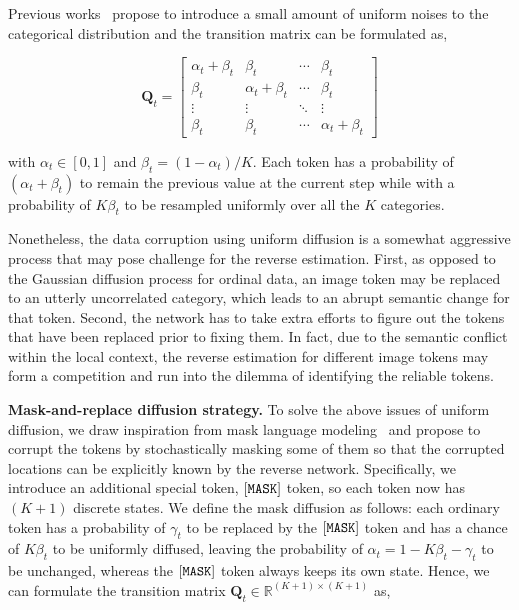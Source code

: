 Previous works~\cite{hoogeboom2021argmax,austin2021structured} propose to introduce a small amount of uniform noises to the categorical distribution and the transition matrix can be formulated as,

\begin{equation}
\bm{Q}_t =
\begin{bmatrix}
\alpha_t + \beta_t &  \beta_t & \cdots &\beta_t\\
\beta_t & \alpha_t +  \beta_t & \cdots&\beta_t\\
\vdots & \vdots &  \ddots   & \vdots\\
\beta_t & \beta_t &  \cdots &\alpha_t+\beta_t
\end{bmatrix}
\end{equation}

with $\alpha_t\in[0,1]$ and $\beta_t = (1-\alpha_t)/K$. Each token has a probability of $(\alpha_t+\beta_t)$ to remain the previous value at the current step while with a probability of $K\beta_t$ to be resampled uniformly over all the $K$ categories. 

Nonetheless, the data corruption using uniform diffusion is a somewhat aggressive process that may pose challenge for the reverse estimation. First, as opposed to the Gaussian diffusion process for ordinal data, an image token may be replaced to an utterly uncorrelated category, which leads to an abrupt semantic change for that token. Second, the network has to take extra efforts to figure out the tokens that have been replaced prior to fixing them. In fact, due to the semantic conflict within the local context, the reverse estimation for different image tokens may form a competition and run into the dilemma of identifying the reliable tokens. 

\textbf{Mask-and-replace diffusion strategy.} To solve the above issues of uniform diffusion, we draw inspiration from mask language modeling~\cite{devlin2018bert} and propose to corrupt the tokens by stochastically masking some of them so that the corrupted locations can be explicitly known by the reverse network. Specifically, we introduce an additional special token, $[\text{\tt{MASK}}]$ token, so each token now has $(K+1)$ discrete states. We define the mask diffusion as follows: each ordinary token has a probability of $\gamma_t$ to be replaced by the $[\text{\tt{MASK}}]$ token and has a chance of $K\beta_t$ to be uniformly diffused, leaving the probability of $\alpha_t = 1-K\beta_t-\gamma_t$ to be unchanged, whereas the $[\text{\tt{MASK}}]$ token always keeps its own state. Hence, we can formulate the  transition matrix $\bm{Q}_t\in \mathbb{R}^{(K+1)\times(K+1)}$ as,

